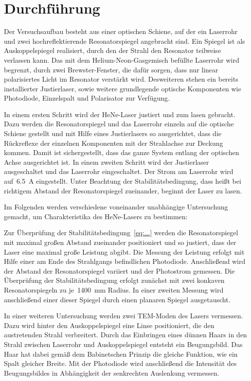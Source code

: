 \section{Durchführung}
\label{sec:durchführung}

Der Versuchsaufbau besteht aus einer optischen Schiene, auf der ein Laserrohr
und zwei hochreflektierende Resonatorspiegel angebracht sind. Ein Spiegel ist
als Auskoppelspiegel realisiert, durch den der Strahl den Resonator teilweise
verlassen kann. Das mit dem Helium-Neon-Gasgemisch befüllte Laserrohr wird begrenzt,
durch zwei Brewster-Fenster, die dafür sorgen, dass nur linear polarisiertes
Licht im Resonator verstärkt wird. Desweiteren stehen ein bereits installierter
Justierlaser, sowie weitere grundlegende optische Komponenten wie Photodiode,
Einzelspalt und Polarisator zur Verfügung.

In einem ersten Schritt wird der HeNe-Laser justiert und zum lasen gebracht.
Dazu werden die Resonatorspiegel und das Laserrohr einzeln auf die
optische Schiene gestellt und mit Hilfe eines Justierlasers so ausgerichtet,
dass die Rückreflexe der einzelnen Komponenten mit der Strahlachse zur Deckung
kommen. Damit ist sichergestellt, dass das ganze System entlang der optischen
Achse ausgerichtet ist. In einem zweiten Schritt wird der Justierlaser
ausgeschaltet und das Laserrohr eingeschaltet. Der Strom am Laserrohr wird
auf~\SI{6.5}{\ampere} eingestellt. Unter Beachtung der Stabilitätsbedingung,
dass heißt bei richtigem Abstand der Resonatorspiegel zueinander, beginnt der
Laser zu lasen.

Im Folgenden werden verschiedene voneinander unabhängige Untersuchung gemacht,
um Charakteristika des HeNe-Lasers zu bestimmen:

Zur Überprüfung der Stabilitätsbedingung~\eqref{eq:...} werden die
Resonatorspiegel mit maximal großen Abstand zueinander positioniert und so
justiert, dass der Laser eine maximal große Leistung abgibt. Die Messung der
Leistung erfolgt mit Hilfe einer am Ende des Strahlgangs befindlichen
Photodiode. Anschließend wird der Abstand der Resonatorspiegel variiert und der
Photostrom gemessen. Die Überprüfung der Stabilitätsbedingung erfolgt zunächst
mit zwei konkaven Resonatorspiegeln zu je~\SI{1400}{\milli\metre} Radius. In
einer zweiten Messung wird anschließend einer dieser Spiegel durch einen
planaren Spiegel ausgetauscht.

In einer weiteren Untersuchung werden zwei TEM-Moden des Lasers vermessen.
Dazu wird hinter den Auskoppelspiegel eine Linse positioniert, die den
austretenden Strahl verbreitert. Durch das Einbringen eines dünnen Haars in den
Strahl zwischen Laserrohr und Auskoppelspiegel entsteht ein Beugungsbild. Das
Haar hat dabei gemäß dem Babinetschen Prinzip die gleiche Funktion, wie ein
Spalt gleicher Breite. Mit der Photodiode wird anschließend die Intensität des
Beugungsbildes in Abhängigkeit der senkrechten Auslenkung vermessen.

